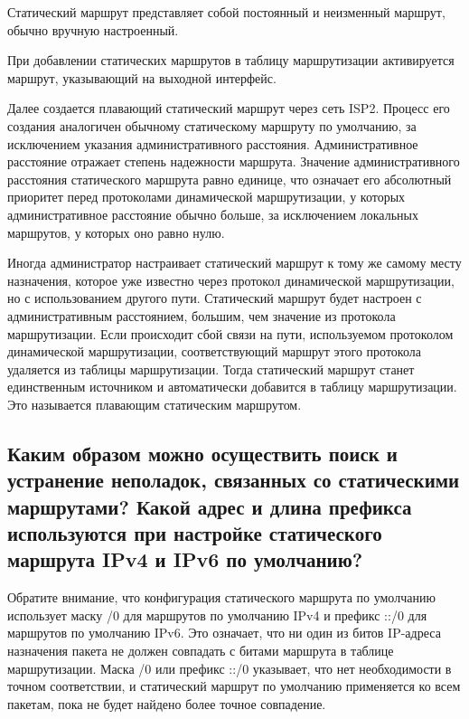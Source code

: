 Статический маршрут представляет собой постоянный и неизменный маршрут,
обычно вручную настроенный.\par
При добавлении статических маршрутов
в таблицу маршрутизации активируется маршрут,
указывающий на выходной интерфейс.\par
Далее создается плавающий статический маршрут через сеть ISP2.
Процесс его создания аналогичен обычному статическому маршруту по умолчанию,
за исключением указания административного расстояния.
Административное расстояние отражает степень надежности маршрута.
Значение административного расстояния статического маршрута равно единице,
что означает его абсолютный приоритет перед протоколами
динамической маршрутизации, у которых административное расстояние
обычно больше, за исключением локальных маршрутов,
у которых оно равно нулю.\par
Иногда администратор настраивает статический маршрут
к тому же самому месту назначения, которое уже известно
через протокол динамической маршрутизации, но с использованием другого пути.
Статический маршрут будет настроен с административным расстоянием, большим,
чем значение из протокола маршрутизации.
Если происходит сбой связи на пути, используемом протоколом динамической
маршрутизации, соответствующий маршрут этого протокола удаляется
из таблицы маршрутизации. Тогда статический маршрут станет единственным
источником и автоматически добавится в таблицу маршрутизации.
Это называется плавающим статическим маршрутом.

\subsection{Каким образом можно осуществить поиск и устранение неполадок,
    связанных со статическими маршрутами?
    Какой адрес и длина префикса используются при настройке
    статического маршрута IPv4 и IPv6 по умолчанию?}

Обратите внимание, что конфигурация статического маршрута
по умолчанию использует маску /0 для маршрутов по умолчанию IPv4
и префикс ::/0 для маршрутов по умолчанию IPv6.
Это означает, что ни один из битов IP-адреса назначения пакета
не должен совпадать с битами маршрута в таблице маршрутизации.
Маска /0 или префикс ::/0 указывает, что нет необходимости
в точном соответствии, и статический маршрут по умолчанию применяется
ко всем пакетам, пока не будет найдено более точное совпадение.